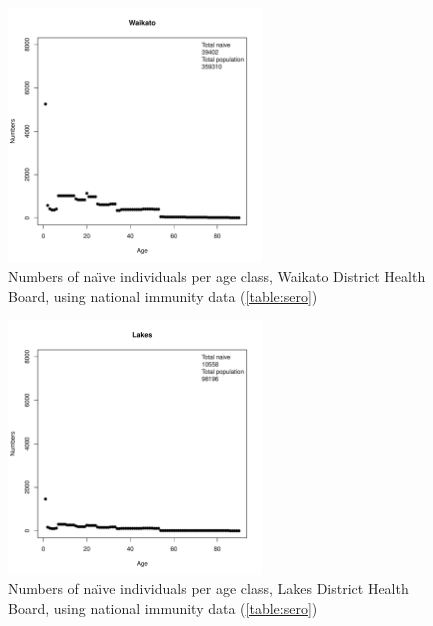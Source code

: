 \documentclass{article}
\begin{document}
\begin{figure}[H]
     \begin{center}
     \includegraphics[width=0.6\textwidth]{dhb5.pdf}
     \end{center}
     \caption{Numbers of na\"{\i}ve individuals per age class, Waikato District Health Board, using national immunity data (\autoref{table:sero})}
     \label{fig:Waikato}
\end{figure}

\begin{figure}[H]
     \begin{center}
     \includegraphics[width=0.6\textwidth]{dhb6.pdf}
     \end{center}
     \caption{Numbers of na\"{\i}ve individuals per age class, Lakes District Health Board, using national immunity data (\autoref{table:sero})}
     \label{fig:Lakes}
\end{figure}
\end{document}
